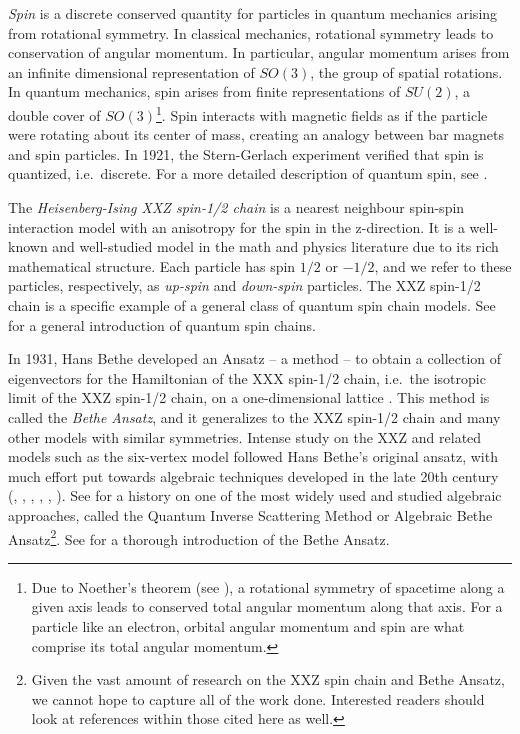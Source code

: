 \documentclass[a4paper,11pt]{article}
\theoremstyle{definition}
\begin{document}
\emph{Spin} is a discrete conserved quantity for particles in quantum mechanics arising from rotational symmetry. In classical mechanics, rotational symmetry leads to conservation of angular momentum. In particular, angular momentum arises from an infinite dimensional representation of $SO(3)$, the group of spatial rotations. In quantum mechanics, spin arises from finite representations of $SU(2)$, a double cover of $SO(3)$\footnote{Due to Noether's theorem (see \cite[Sec.~4.5]{schwichtenberg_physics_2018}), a rotational symmetry of spacetime along a given axis leads to conserved total angular momentum along that axis. For a particle like an electron, orbital angular momentum and spin are what comprise its total angular momentum.}. Spin interacts with magnetic fields as if the particle were rotating about its center of mass, creating an analogy between bar magnets and spin particles. In 1921, the Stern-Gerlach experiment verified that spin is quantized, i.e.~discrete. For a more detailed description of quantum spin, see \cite[Sec.~3.7, 4.5, 8.5]{schwichtenberg_physics_2018}.

The \emph{Heisenberg-Ising XXZ spin-1/2 chain} is a nearest neighbour spin-spin interaction model with an anisotropy for the spin in the z-direction. It is a well-known and well-studied model in the math and physics literature due to its rich mathematical structure. Each particle has spin $1/2$ or $-1/2$, and we refer to these particles, respectively, as \emph{up-spin} and \emph{down-spin} particles. The XXZ spin-1/2 chain is a specific example of a general class of quantum spin chain models. See \cite{parkinson_introduction_2010} for a general introduction of quantum spin chains. 

In 1931, Hans Bethe developed an Ansatz -- a method -- to obtain a collection of eigenvectors for the Hamiltonian of the XXX spin-1/2 chain, i.e.~the isotropic limit of the XXZ spin-1/2 chain, on a one-dimensional lattice \cite{bethe_zur_1931}. This method is called the \emph{Bethe Ansatz}, and it generalizes to the XXZ spin-1/2 chain and many other models with similar symmetries. Intense study on the XXZ and related models such as the six-vertex model followed Hans Bethe's original ansatz, with much effort put towards algebraic techniques developed in the late 20th century (\cite{Kulish:1981bi}, \cite{Jimbo1994-mc}, \cite{Jimbo1992-zh}, \cite{Davies1993-su}, \cite{Baxter1972-xm}, \cite{Korepin1993-yu}). See \cite{Faddeev1995-io} for a history on one of the most widely used and studied algebraic approaches, called the Quantum Inverse Scattering Method or Algebraic Bethe Ansatz\footnote{Given the vast amount of research on the XXZ spin chain and Bethe Ansatz, we cannot hope to capture all of the work done. Interested readers should look at references within those cited here as well.}. See \cite{baxter_exactly_1982, caux_bethe_2014, Korepin1993-zf,Arutyunov_2026} for a thorough introduction of the Bethe Ansatz.
\end{document}
